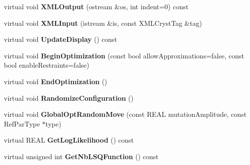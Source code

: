 \begin{DoxyCompactItemize}
\mbox{\label{class_obj_cryst_1_1_molecule_a7843b891ef80e85ff978783123e88a07}} 
virtual void {\bfseries X\+M\+L\+Output} (ostream \&os, int indent=0) const
\item 
\mbox{\label{class_obj_cryst_1_1_molecule_a6561971de5ad4e3d2c55070d3ed91bb6}} 
virtual void {\bfseries X\+M\+L\+Input} (istream \&is, const X\+M\+L\+Cryst\+Tag \&tag)
\item 
\mbox{\label{class_obj_cryst_1_1_molecule_aaa1a3252710052d4f05910e786d42be5}} 
virtual void {\bfseries Update\+Display} () const
\item 
\mbox{\label{class_obj_cryst_1_1_molecule_a6a924fbe5da33f72648f9c4522d6d717}} 
virtual void {\bfseries Begin\+Optimization} (const bool allow\+Approximations=false, const bool enable\+Restraints=false)
\item 
\mbox{\label{class_obj_cryst_1_1_molecule_a32dd6583494632e5d38fee517808f5be}} 
virtual void {\bfseries End\+Optimization} ()
\item 
\mbox{\label{class_obj_cryst_1_1_molecule_a943dfe6b5fe77f025b16325f62c58aff}} 
virtual void {\bfseries Randomize\+Configuration} ()
\item 
\mbox{\label{class_obj_cryst_1_1_molecule_ae31f39cbb6cb2be6c7428dfc5fceb79e}} 
virtual void {\bfseries Global\+Opt\+Random\+Move} (const R\+E\+AL mutation\+Amplitude, const Ref\+Par\+Type $\ast$type)
\item 
\mbox{\label{class_obj_cryst_1_1_molecule_a979d3cc91830566a14d23cc77670c5a6}} 
virtual R\+E\+AL {\bfseries Get\+Log\+Likelihood} () const
\item 
\mbox{\label{class_obj_cryst_1_1_molecule_a411109a1ba75b57a57ce2f0c59e1419b}} 
virtual unsigned int {\bfseries Get\+Nb\+L\+S\+Q\+Function} () const
\item 
\mbox{\label{class_obj_cryst_1_1_molecule_af2f711ea4838bc9fbd0a343d599ff203}} 

\end{DoxyCompactItemize}
